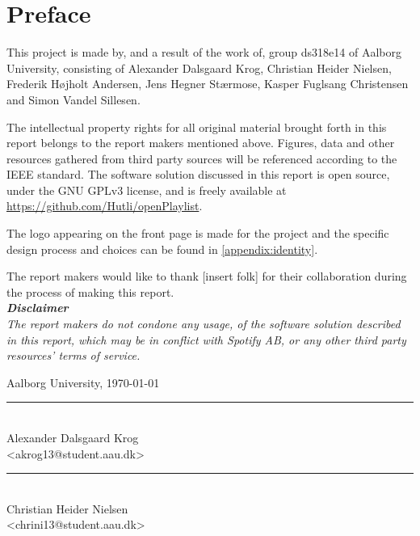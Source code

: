 \chapter*{Preface}\label{ch:preface}
 \thispagestyle{empty}
This project is made by, and a result of the work of, group ds318e14 of Aalborg University, consisting of Alexander Dalsgaard Krog, Christian Heider Nielsen, Frederik Højholt Andersen, Jens Hegner Stærmose, Kasper Fuglsang Christensen and Simon Vandel Sillesen.

The intellectual property rights for all original material brought forth in this report belongs to the report makers mentioned above. Figures, data and other resources gathered from third party sources will be referenced according to the IEEE standard. The software solution discussed in this report is open source, under the GNU GPLv3 license, and is freely available at \url{https://github.com/Hutli/openPlaylist}.

The logo appearing on the front page is made for the project and the specific design process and choices can be found in \cref{appendix:identity}.


The report makers would like to thank [insert folk] for their collaboration during the process of making this report.\\

\noindent
\textit{
\textbf{Disclaimer}\\
The report makers do not condone any usage, of the software solution described in this report, which may be in conflict with Spotify AB, or any other third party resources' terms of service.}

\vspace{\baselineskip}\hfill Aalborg University, \today
\vfill

\noindent
\begin{minipage}[b]{0.45\textwidth}
 \centering
 \rule{\textwidth}{0.5pt}\\
  Alexander Dalsgaard Krog\\
 {\footnotesize <akrog13@student.aau.dk>}
\end{minipage}
\hfill
\begin{minipage}[b]{0.45\textwidth}
 \centering
 \rule{\textwidth}{0.5pt}\\
  Christian Heider Nielsen\\
 {\footnotesize <chrini13@student.aau.dk>}
\end{minipage}
\vspace{3\baselineskip}

